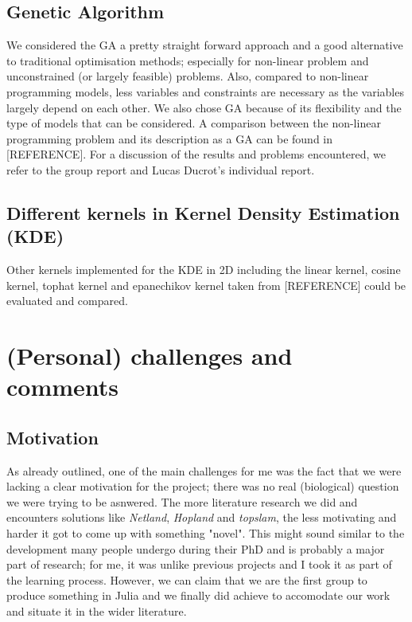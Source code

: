 \documentclass[journal, a4paper]{IEEEtran}
\begin{document}
\subsection{Genetic Algorithm}
We considered the GA a pretty straight forward approach and a good alternative to traditional optimisation methods; especially for non-linear problem and unconstrained (or largely feasible) problems. Also, compared to non-linear programming models, less variables and constraints are necessary as the variables largely depend on each other. We also chose GA because of its flexibility and the type of models that can be considered. A comparison between the non-linear programming problem and its description as a GA can be found in [REFERENCE].%
For a discussion of the results and problems encountered, we refer to the group report and Lucas Ducrot's individual report.


\subsection{Different kernels in Kernel Density Estimation (KDE)} 

Other kernels implemented for the KDE in 2D including the linear kernel, cosine kernel, tophat kernel and epanechikov kernel taken from [REFERENCE] could be evaluated and compared. 


\section{(Personal) challenges and comments}\label{personalchallenges}


\subsection{Motivation}
As already outlined, one of the main challenges for me was the fact that we were lacking a clear motivation for the project; there was no real (biological) question we were trying to be asnwered. The more literature research we did and encounters solutions like \textit{Netland}, \textit{Hopland} and \textit{topslam}, the less motivating and harder it got to come up with something "novel". This might sound similar to the development many people undergo during their PhD and is probably a major part of research; for me, it was unlike previous projects and I took it as part of the learning process.
However, we can claim that we are the first group to produce something in Julia and we finally did achieve to accomodate our work and situate it in the wider literature. 
\end{document}
